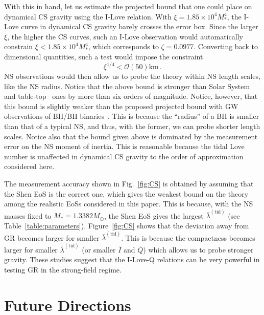 \documentclass[aps,twocolumn,nofootinbib,showpacs,superscriptaddress,hyperref]{revtex4-1}
\newcommand\be{\begin{equation}}
\newcommand\ee{\end{equation}}
\newcommand{\NS}{*}
\newcommand{\tid}{\mathrm{(tid)}}
\newcommand{\mrm}{\mathrm}
\newcommand{\Qbar}{\bar{Q}}
\begin{document}
With this in hand, let us estimate the projected bound that one could place on dynamical CS gravity using the I-Love relation. With $\xi=1.85 \times 10^4 M_\NS^4$, the I-Love curve in dynamical CS gravity barely crosses the error box. Since the larger $\xi$, the higher the CS curves, such an I-Love observation would automatically constrain $\xi < 1.85 \times 10^{4} M_{\NS}^{4}$, which corresponds to $\zeta = 0.0977$. Converting back to dimensional quantities, such a test would impose the constraint 
%
\be
\xi^{1/4} < \mathcal{O}(50) \mrm{km}\,.
\label{bound}
\ee
%
NS observations would then allow us to probe the theory within NS length scales, like the NS radius. Notice that the above bound is stronger than Solar System~\cite{alihaimoud-chen} and table-top~\cite{kent-CSBH} ones by more than six orders of magnitude. Notice, however, that this bound is slightly weaker than the proposed projected bound with GW observations of BH/BH binaries~\cite{kent-CSGW}. This is because the ``radius'' of a BH is smaller than that of a typical NS, and thus, with the former, we can probe shorter length scales. Notice also that the bound given above is dominated by the measurement error on the NS moment of inertia. This is reasonable because the tidal Love number is unaffected in dynamical CS gravity to the order of approximation considered here.

The measurement accuracy shown in Fig.~\ref{fig:CS} is obtained by assuming that the Shen EoS is the correct one, which gives the weakest bound on the theory among the realistic EoSs considered in this paper. This is because, with the NS masses fixed to $M_\NS=1.3382M_\odot$, the Shen EoS gives the largest $\bar{\lambda}^\tid$ (see Table~\ref{table:parameters}). Figure~\ref{fig:CS} shows that the deviation away from GR becomes larger for smaller $\bar{\lambda}^\tid$. This is because the compactness becomes larger for smaller $\bar{\lambda}^\tid$ (or smaller $\bar{I}$ and $\Qbar$) which allows us to probe stronger gravity. These studies suggest that the I-Love-Q relations can be very powerful in testing GR in the strong-field regime. 

\section{Future Directions}
\label{sec:conclusions}
\end{document}
